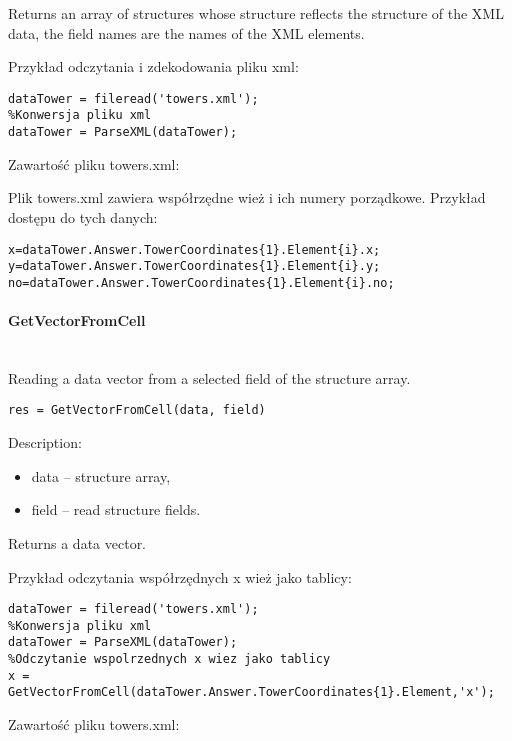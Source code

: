 Returns an array of structures whose structure reflects the structure of the XML data, the field names are the names of the XML elements.

Przykład odczytania i zdekodowania pliku xml:
\begin{lstlisting}[style=Matlab-editor]
%Odczytanie pliku xml
dataTower = fileread('towers.xml');
%Konwersja pliku xml
dataTower = ParseXML(dataTower);
\end{lstlisting}

Zawartość pliku towers.xml:


Plik towers.xml zawiera współrzędne wież i ich numery porządkowe. Przykład dostępu do tych danych:
\begin{lstlisting}[style=Matlab-editor]
x=dataTower.Answer.TowerCoordinates{1}.Element{i}.x;
y=dataTower.Answer.TowerCoordinates{1}.Element{i}.y;
no=dataTower.Answer.TowerCoordinates{1}.Element{i}.no;
\end{lstlisting}

\paragraph{GetVectorFromCell} \hspace{0pt} \\
Reading a data vector from a selected field of the structure array.
\begin{lstlisting}[style=Matlab-editor]
res = GetVectorFromCell(data, field)
\end{lstlisting}

Description:
\begin{itemize}
\item data -- structure array,
\item field -- read structure fields.
\end{itemize}

Returns a data vector.

Przykład odczytania współrzędnych x wież jako tablicy:
\begin{lstlisting}[style=Matlab-editor]
%Odczytanie pliku xml
dataTower = fileread('towers.xml');
%Konwersja pliku xml
dataTower = ParseXML(dataTower);
%Odczytanie wspolrzednych x wiez jako tablicy
x = GetVectorFromCell(dataTower.Answer.TowerCoordinates{1}.Element,'x');
\end{lstlisting}

Zawartość pliku towers.xml:


